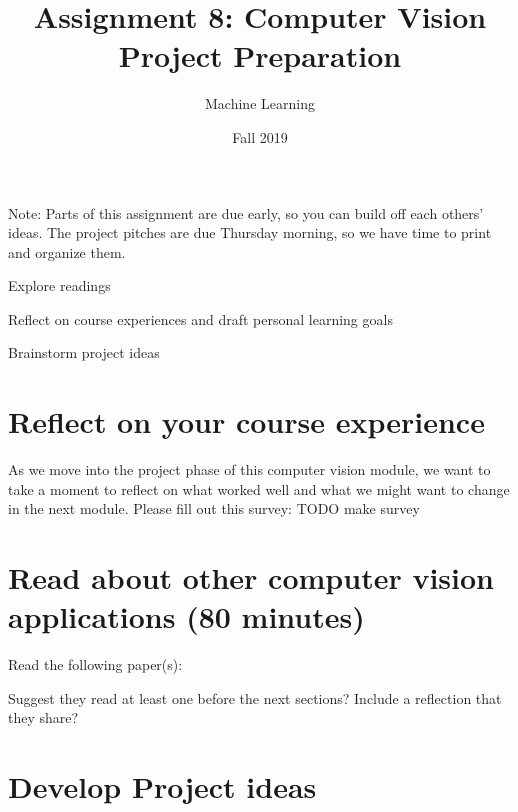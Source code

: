 \documentclass[assignment08_Solutions]{subfiles}
\title{Assignment 8: Computer Vision Project Preparation}
\author{Machine Learning}
\date{Fall 2019}
\begin{document}
\maketitle
\thispagestyle{firstpage}

Note: Parts of this assignment are due early, so you can build off each others' ideas. The project pitches are due Thursday morning, so we have time to print and organize them.
\vspace{2em}



\begin{learningobjectives}
\bi
\item Explore readings
\item Reflect on course experiences and draft personal learning goals
\item Brainstorm project ideas
\ei
\end{learningobjectives}


\section{Reflect on your course experience}

\begin{exercise}[(20 minutes)]
As we move into the project phase of this computer vision module, we want to take a moment to reflect on what worked well and what we might want to change in the next module. Please fill out this survey:
TODO make survey
\end{exercise}
 


\section{Read about other computer vision applications (80 minutes)}

\begin{exercise}[(80 minutes)]
Read the following paper(s):

Suggest they read at least one before the next sections?
Include a reflection that they share?
\end{exercise}


\section{Develop Project ideas}
\end{document}
